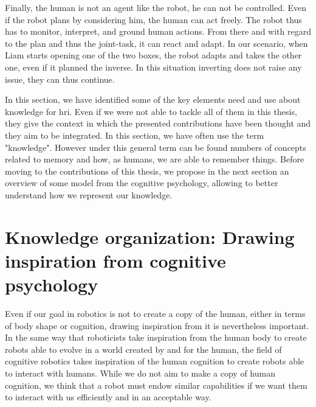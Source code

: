 Finally, the human is not an agent like the robot, he can not be controlled. Even if the robot plans by considering him, the human can act freely. The robot thus has to monitor, interpret, and ground human actions. From there and with regard to the plan and thus the joint-task, it can react and adapt. In our scenario, when Liam starts opening one of the two boxes, the robot adapts and takes the other one, even if it planned the inverse. In this situation inverting does not raise any issue, they can thus continue.

In this section, we have identified some of the key elements need and use about knowledge for \acrfull{hri}. Even if we were not able to tackle all of them in this thesis, they give the context in which the presented contributions have been thought and they aim to be integrated. In this section, we have often use the term "knowledge". However under this general term can be found numbers of concepts related to memory and how, as humans, we are able to remember things. Before moving to the contributions of this thesis, we propose in the next section an overview of some model from the cognitive psychology, allowing to better understand how we represent our knowledge.

\section[Knowledge organization]{Knowledge organization: Drawing inspiration from cognitive psychology }

Even if our goal in robotics is not to create a copy of the human, either in terms of body shape or cognition, drawing inspiration from it is nevertheless important. In the same way that roboticists take inspiration from the human body to create robots able to evolve in a world created by and for the human, the field of cognitive robotics takes inspiration of the human cognition to create robots able to interact with humans. While we do not aim to make a copy of human cognition, we think that a robot must endow similar capabilities if we want them to interact with us efficiently and in an acceptable way.


